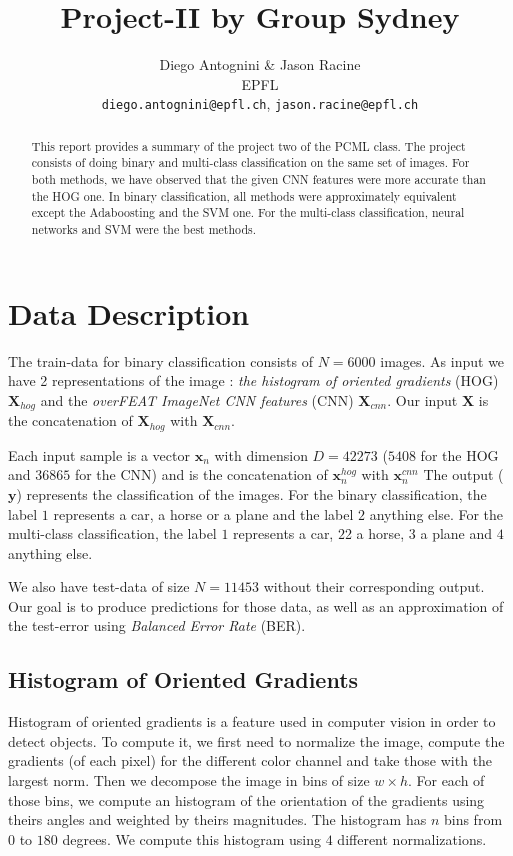 \documentclass{article} %
\title{Project-II by Group Sydney}
\author{
Diego Antognini \& Jason Racine\\
EPFL \\
\texttt{diego.antognini@epfl.ch}, \texttt{jason.racine@epfl.ch} \\
}
\begin{document}
\maketitle

\begin{abstract}
This report provides a summary of the project two of the PCML class. The project consists of doing binary and multi-class classification on the same set of images. For both methods, we have observed that the given CNN features were more accurate than the HOG one. In binary classification, all methods were approximately equivalent except the Adaboosting and the SVM one. For the multi-class classification, neural networks and SVM were the best methods.

\end{abstract}

\section{Data Description}

The train-data for binary classification consists of $N = 6000$ images. As input we have 2 representations of the image : \textit{the histogram of oriented gradients} (HOG) $\mathbf{X}_{hog}$ and the \textit{overFEAT ImageNet CNN features} (CNN) $\mathbf{X}_{cnn}$. Our input $\mathbf{X}$ is the concatenation of $\mathbf{X}_{hog}$ with $\mathbf{X}_{cnn}$. 

Each input sample is a vector $\mathbf{x}_n$ with dimension $D = 42273$ ($5408$ for the HOG and $36865$ for the CNN) and is the concatenation of $\mathbf{x}_n^{hog}$ with $\mathbf{x}_n^{cnn}$
The output ($\mathbf{y}$) represents the classification of the images. For the binary classification, the label $1$  represents a car, a horse or a plane and the label $2$ anything else. For the multi-class classification, the label $1$ represents a car, $2$2 a horse, $3$ a plane and $4$ anything else.

We also have test-data of size $N=11453$ without their corresponding output. Our goal is to produce predictions for those data, as well as an approximation of the test-error using \textit{Balanced Error Rate} (BER).

\subsection{Histogram of Oriented Gradients}

Histogram of oriented gradients is a feature used in computer vision in order to detect objects. To compute it, we first need to normalize the image, compute the gradients (of each pixel) for the different color channel and take those with the largest norm. Then we decompose the image in bins of size $w \times h$. For each of those bins, we compute an histogram of the orientation of the gradients using theirs angles and weighted by theirs magnitudes. The histogram has $n$ bins from $0$ to $180$ degrees. We compute this histogram using $4$ different normalizations.
\end{document}
